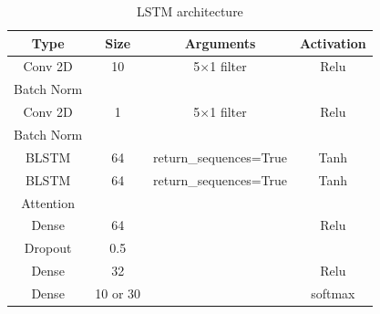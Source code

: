 \documentclass{report}
\theoremstyle{definition}
\theoremstyle{remark}
\begin{document}
\begin{table}[!hbt]
    \centering
    \small
        \begin{tabular}{cccc}
            \hline
            Type & Size & Arguments & Activation \\ \hline
            Conv 2D & 10 & 5$\times$1 filter & Relu \\ 
            Batch Norm &  &  &  \\ 
            Conv 2D & 1 & 5$\times$1 filter & Relu \\ 
            Batch Norm &  &  &  \\ 
            BLSTM & 64 & return\_sequences=True & Tanh \\ 
            BLSTM & 64 & return\_sequences=True & Tanh \\ 
            Attention & & & \\ 
            Dense & 64 &  & Relu \\
            Dropout & 0.5 &  &  \\ 
            Dense & 32 &  & Relu \\ 
            Dense & 10 or 30 &  & softmax \\ \hline
        \end{tabular}
        \caption{LSTM architecture}
    \label{tab:lstm}
\end{table}

\end{document}

